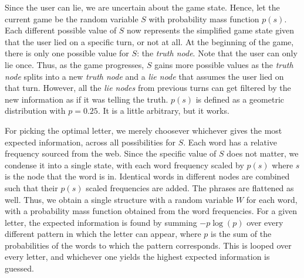     Since the user can lie, we are uncertain about the game state. Hence, let the current game be the random variable $S$ with probability mass function $p(s)$. Each different possible value of $S$ now represents the simplified game state given that the user lied on a specific turn, or not at all. At the beginning of the game, there is only one possible value for $S$: the \textit{truth node}. Note that the user can only lie once. Thus, as the game progresses, $S$ gains more possible values as the \textit{truth node} splits into a new \textit{truth node} and a \textit{lie node} that assumes the user lied on that turn. However, all the \textit{lie nodes} from previous turns can get filtered by the new information as if it was telling the truth. $p(s)$ is defined as a geometric distribution with $p=0.25$. It is a little arbitrary, but it works.

    For picking the optimal letter, we merely choosever whichever gives the most expected information, across all possibilities for $S$. Each word has a relative frequency sourced from the web. Since the specific value of $S$ does not matter, we condense it into a single state, with each word frequency scaled by $p(s)$ where $s$ is the node that the word is in. Identical words in different nodes are combined such that their $p(s)$ scaled frequencies are added. The phrases are flattened as well. Thus, we obtain a single structure with a random variable $W$ for each word, with a probability mass function obtained from the word frequencies. For a given letter, the expected information is found by summing $-p \log(p)$ over every different pattern in which the letter can appear, where $p$ is the sum of the probabilities of the words to which the pattern corresponds. This is looped over every letter, and whichever one yields the highest expected information is guessed.


